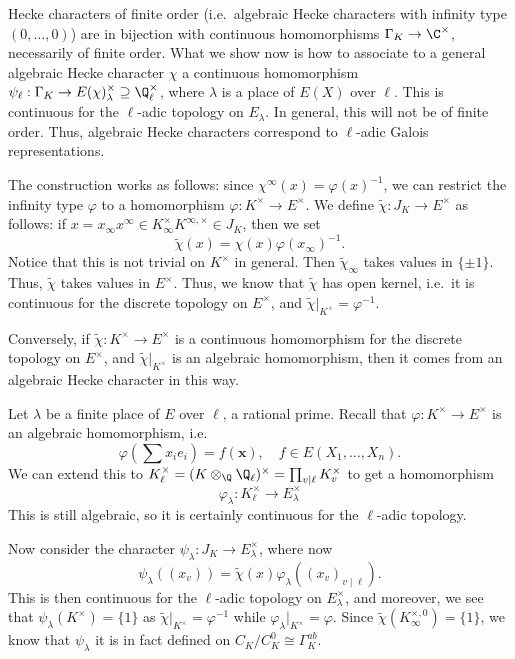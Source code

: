 \documentclass[a4paper]{article}
\begin{document}
Hecke characters of finite order (i.e.\ algebraic Hecke characters with infinity type $(0, \ldots, 0)$) are in bijection with continuous homomorphisms $\Gamma_K \to \C^\times$, necessarily of finite order. What we show now is how to associate to a general algebraic Hecke character $\chi$ a continuous homomorphism $\psi_\ell: \Gamma_K \to E(\chi)_\lambda^\times \supseteq \Q_\ell^\times$, where $\lambda$ is a place of $E(X)$ over $\ell$. This is continuous for the $\ell$-adic topology on $E_\lambda$. In general, this will not be of finite order. Thus, algebraic Hecke characters correspond to $\ell$-adic Galois representations.

The construction works as follows: since $\chi^\infty(x) = \varphi(x)^{-1}$, we can restrict the infinity type $\varphi$ to a homomorphism $\varphi: K^\times \to E^\times$. We define $\tilde{\chi}: J_K \to E^\times$ as follows: if $x = x_\infty x^\infty \in K_\infty^\times K^{\infty, \times} \in J_K$, then we set
\[
  \tilde{\chi}(x) = \chi(x) \varphi(x_\infty)^{-1}.
\]
Notice that this is not trivial on $K^\times$ in general. Then $\tilde{\chi}_\infty$ takes values in $\{\pm 1\}$. Thus, $\tilde{\chi}$ takes values in $E^\times$. Thus, we know that $\tilde{\chi}$ has open kernel, i.e.\ it is continuous for the discrete topology on $E^\times$, and $\tilde{\chi}|_{K^\times} = \varphi^{-1}$.

Conversely, if $\tilde{\chi}: K^\times \to E^\times$ is a continuous homomorphism for the discrete topology on $E^\times$, and $\tilde{\chi}|_{K^\times}$ is an algebraic homomorphism, then it comes from an algebraic Hecke character in this way.

Let $\lambda$ be a finite place of $E$ over $\ell$, a rational prime. Recall that $\varphi: K^\times \to E^\times$ is an algebraic homomorphism, i.e.
\[
  \varphi\left(\sum x_i e_i\right) = f(\mathbf{x}),\quad f \in E(X_1, \ldots, X_n).
\]
We can extend this to $K_\ell^\times = (K \otimes_{\Q} \Q_\ell)^\times = \prod_{v \mid \ell} K_v^\times$ to get a homomorphism
\[
  \varphi_\lambda: K_\ell^\times \to E_\lambda^\times
\]
This is still algebraic, so it is certainly continuous for the $\ell$-adic topology.

Now consider the character $\psi_\lambda: J_K \to E_\lambda^\times$, where now
\[
  \psi_\lambda((x_v)) = \tilde{\chi}(x) \varphi_\lambda((x_v)_{v \mid \ell}).
\]
This is then continuous for the $\ell$-adic topology on $E_\lambda^\times$, and moreover, we see that $\psi_\lambda(K^\times) = \{1\}$ as $\tilde{\chi}|_{K^\times} = \varphi^{-1}$ while $\varphi_\lambda|_{K^\times} = \varphi$. Since $\tilde{\chi}(K_\infty^{\times, 0}) = \{1\}$, we know that $\psi_\lambda$ it is in fact defined on $C_K/C_K^0 \cong \Gamma_K^{ab}$.
\end{document}
